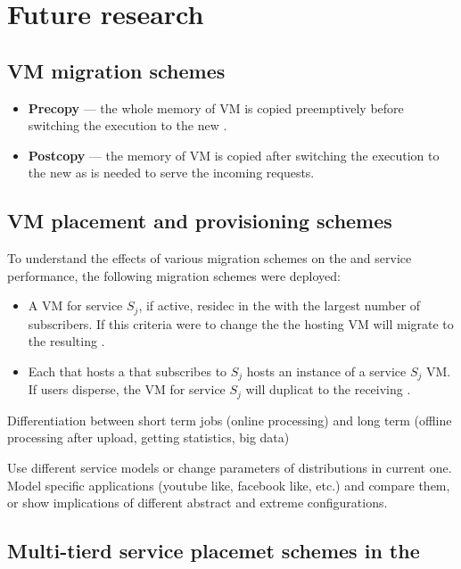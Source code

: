 \section{Future research}

\subsection{VM migration schemes}
\begin{itemize}
\item \textbf{Precopy} --- the whole memory of VM is copied preemptively before switching the execution to the new \dc{}.
\item \textbf{Postcopy} --- the memory of VM is copied after switching the execution to the new \dc{} as is needed to serve the incoming requests.
\end{itemize}

\subsection{VM placement and \dc{} provisioning schemes}
To understand the effects of various migration schemes on the \dc and service performance, the following migration schemes were deployed:

\begin{itemize}
\item A VM for service $S_j$, if active, residec in the \dc with the largest number of subscribers. If this criteria were to change the the hosting VM will migrate to the resulting \dc.
\item Each \dc that hosts a \ue that subscribes to $S_j$ hosts an instance of a service $S_j$ VM. If users disperse, the VM for service $S_j$ will duplicat to the receiving \dc.
\end{itemize}

Differentiation between short term jobs (online processing) and long term (offline processing after upload, getting statistics, big data)

Use different service models or change parameters of distributions in current one.
Model specific applications (youtube like, facebook like, etc.) and compare them, or show implications of different abstract and extreme configurations.

\subsection{Multi-tierd service placemet schemes in the \xcloud{}}
